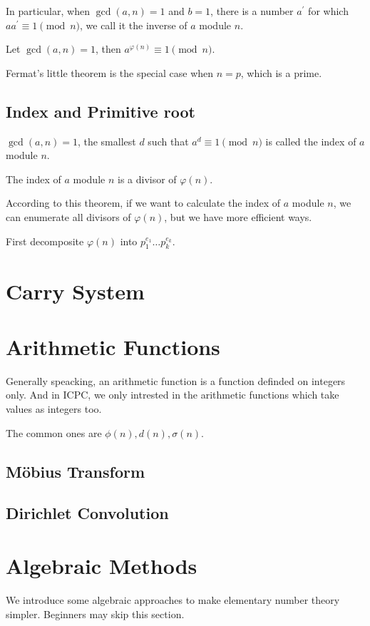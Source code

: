 In particular, when $\gcd(a, n) = 1$ and $b = 1$, there is a number $a^\prime$
for which $aa^\prime \equiv 1 \pmod n$, we call it the inverse of $a$ module $n$.

\begin{thm}
Let $\gcd(a, n) = 1$, then $a^{\varphi(n)} \equiv 1 \pmod n$.
\end{thm}
Fermat's little theorem is the special case when $n = p$, which is a prime.
\subsection{Index and Primitive root}
$\gcd(a, n) = 1$, the smallest $d$ such that $a^d \equiv 1 \pmod n$ is called the
index of $a$ module $n$.

\begin{thm}
The index of $a$ module $n$ is a divisor of $\varphi(n)$.
\end{thm}
According to this theorem, if we want to calculate the index of $a$ module $n$,
we can enumerate all divisors of $\varphi(n)$, but we have more efficient ways.

First decomposite $\varphi(n)$ into $p_1^{e_1} \dots p_k^{e_k}$.

\section{Carry System}

\section{Arithmetic Functions}
Generally speacking, an arithmetic function is a function definded on integers only.
And in ICPC, we only intrested in the arithmetic functions which take values as
integers too.

The common ones are $\phi(n), d(n), \sigma(n)$.

\subsection{M\"obius Transform}
\subsection{Dirichlet Convolution}

\section{Algebraic Methods}
We introduce some algebraic approaches to make elementary number theory simpler.
Beginners may skip this section.

